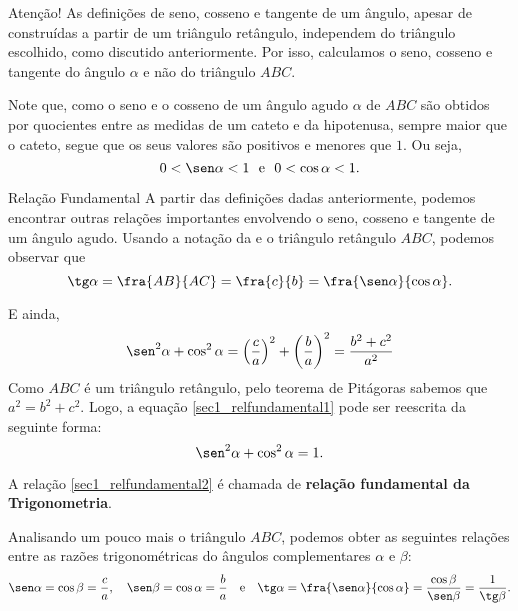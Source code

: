 \begin{observationtitle}{Atenção!}
As definições de seno, cosseno e tangente de um ângulo, apesar de construídas a partir de um triângulo retângulo, independem do triângulo escolhido, como discutido anteriormente. Por isso, calculamos o seno, cosseno e tangente do ângulo $\alpha$ e não do triângulo $ABC$.
\end{observationtitle}

Note que, como o seno e o cosseno de um ângulo agudo $\alpha$ de $ABC$ são obtidos por quocientes entre as medidas de um cateto e da hipotenusa, sempre maior que o cateto, segue que os seus valores são positivos e menores que $1$. Ou seja, 
$$0 < \sen\alpha < 1 \ \ \text{e}  \ \ 0  < \cos\alpha < 1.$$

\begin{observationtitle}{Relação Fundamental}
A partir das definições dadas anteriormente, podemos encontrar outras relações importantes envolvendo o seno, cosseno e tangente de um ângulo agudo. Usando a notação da  e o triângulo retângulo $ABC$, podemos observar que
$$\tg\alpha=\fra{AB}{AC}=\fra{c}{b}=\fra{\sen\alpha}{\cos\alpha}.$$

E ainda,
\begin{equation}\label{sec1_relfundamental1}
\sen^2\alpha+\cos^2\alpha=\left(\frac{c}{a}\right)^2+\left(\frac{b}{a}\right)^2=\frac{b^2+c^2}{a^2}
\end{equation}
Como $ABC$ é um triângulo retângulo, pelo teorema de Pitágoras sabemos que $a^2=b^2+c^2$. Logo, a equação \eqref{sec1_relfundamental1} pode ser reescrita da seguinte forma:
\begin{equation}\label{sec1_relfundamental2}
\sen^2\alpha+\cos^2\alpha=1.
\end{equation}

A relação \eqref{sec1_relfundamental2} é chamada de {\textbf{relação fundamental da Trigonometria}}.
\end{observationtitle}

Analisando um pouco mais o triângulo $ABC$, podemos obter as seguintes relações entre as razões trigonométricas do ângulos complementares $\alpha$ e $\beta$:
$$\sen\alpha=\cos\beta=\frac{c}{a}, \quad  \sen\beta=\cos\alpha=\frac{b}{a} \quad \text{e} \quad \tg\alpha=\fra{\sen\alpha}{\cos\alpha}=\frac{\cos\beta}{\sen\beta}=\frac{1}{\tg\beta}.$$
    
